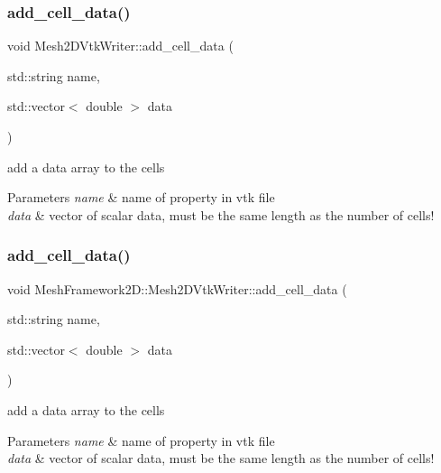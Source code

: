 \subsubsection{\texorpdfstring{add\+\_\+cell\+\_\+data()}{add\_cell\_data()}\hspace{0.1cm}{\footnotesize\ttfamily [1/2]}}
{\footnotesize\ttfamily void Mesh2\+D\+Vtk\+Writer\+::add\+\_\+cell\+\_\+data (\begin{DoxyParamCaption}\item[{std\+::string}]{name,  }\item[{std\+::vector$<$ double $>$}]{data }\end{DoxyParamCaption})}



add a data array to the cells 


\begin{DoxyParams}{Parameters}
{\em name} & name of property in vtk file \\
\hline
{\em data} & vector of scalar data, must be the same length as the number of cells! \\
\hline
\end{DoxyParams}
\mbox{\label{classMeshFramework2D_1_1Mesh2DVtkWriter_aebb67019f770f5310720d765a2f7a3f0}} 
\subsubsection{\texorpdfstring{add\+\_\+cell\+\_\+data()}{add\_cell\_data()}\hspace{0.1cm}{\footnotesize\ttfamily [2/2]}}
{\footnotesize\ttfamily void Mesh\+Framework2\+D\+::\+Mesh2\+D\+Vtk\+Writer\+::add\+\_\+cell\+\_\+data (\begin{DoxyParamCaption}\item[{std\+::string}]{name,  }\item[{std\+::vector$<$ double $>$}]{data }\end{DoxyParamCaption})}



add a data array to the cells 


\begin{DoxyParams}{Parameters}
{\em name} & name of property in vtk file \\
\hline
{\em data} & vector of scalar data, must be the same length as the number of cells! \\
\hline
\end{DoxyParams}
\mbox{\label{classMeshFramework2D_1_1Mesh2DVtkWriter_a77fe1b72a7d690335c4b6f485d85dd9c}} 
